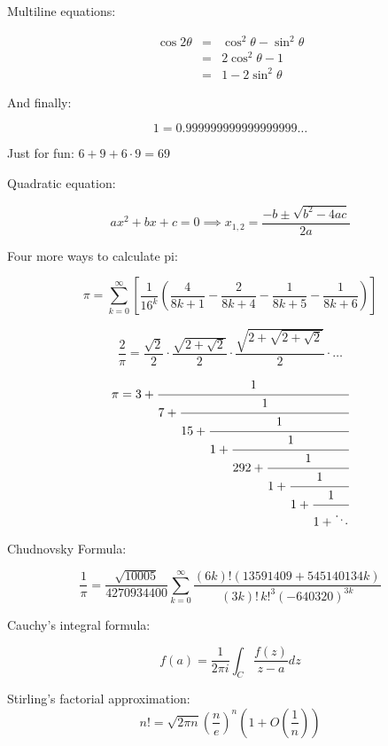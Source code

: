 \documentclass{article}
\begin{document}
Multiline equations:

\begin{eqnarray*}
\cos{2\theta} & = & \cos^2\theta - \sin^2\theta \\
              & = & 2\cos^2\theta - 1 \\
              & = & 1 - 2\sin^2\theta
\end{eqnarray*}

And finally:

$$1=0.999999999999999999\ldots$$

Just for fun: $6 + 9 + 6 \cdot 9 = 69$

Quadratic equation:

\[
  ax^2+bx+c=0 \implies x_{1,2}=\frac{-b\pm\sqrt{b^2-4ac}}{2a}  
\]

Four more ways to calculate pi:

\begin{equation*}
  \pi=\sum_{k=0}^\infty\left[\frac{1}{16^k}\left(\frac{4}{8k+1}-\frac{2}{8k+4}-\frac{1}{8k+5}-\frac{1}{8k+6} \right) \right]
\end{equation*}

\begin{equation*}
  \frac{2}{\pi}=\frac{\sqrt{2}}{2}\cdot\frac{\sqrt{2+\sqrt{2}}}{2}\cdot\frac{\sqrt{2+\sqrt{2+\sqrt{2}}}}{2}\cdot\ldots
\end{equation*}

\begin{equation*}
\pi = 3+\textstyle \cfrac{1}{7+\textstyle \cfrac{1}{15+\textstyle \cfrac{1}{1+\textstyle \cfrac{1}{292+\textstyle \cfrac{1}{1+\textstyle \cfrac{1}{1+\textstyle \cfrac{1}{1+\ddots}}}}}}}
\end{equation*}

Chudnovsky Formula:

\[
\frac{1}{\pi} = \frac{\sqrt{10005}}{4270934400} \sum_{k=0}^\infty \frac{(6k)! (13591409 + 545140134k)}{(3k)!\,k!^3 (-640320)^{3k}}
\]

Cauchy's integral formula:

$$f(a)=\frac{1}{2\pi i}\int_{C} \frac{f(z)}{z-a} dz $$

Stirling's factorial approximation:
$$n! = \sqrt{2 \pi n} \left( \frac{n}{e} \right)^n \left( 1 + O \left( \frac{1}{n} \right) \right)$$
\end{document}
